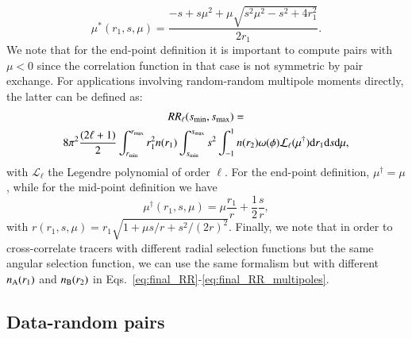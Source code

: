 \documentclass{aa}
\newcommand{\dd}{\mathrm{d}}
\begin{document}
%
\begin{equation}
    \mu^*(r_1, s, \mu) = \frac{-s+s\mu^2+\mu\sqrt{s^2\mu^2-s^2+4r_1^2}}{2r_1}.
\end{equation}
%
We note that for the end-point definition it is important to compute pairs with $\mu < 0$ since the correlation function in that case is not symmetric by pair exchange. For applications involving random-random multipole moments directly, the latter can be defined as: 
%
\begin{multline}
  RR_\ell(s_{\rm min}, s_{\rm max})  = \\
  8\pi^2\frac{(2\ell+1)}{2}\int_{r_{\rm min}}^{r_{\rm max}}r_1^2 n(r_1) \int_{s_{\rm min}}^{s_{\rm max}}s^2 \int_{-1}^{1} n(r_2)\omega(\phi)\mathcal{L}_\ell(\mu^\dagger)\dd r_1\dd s\dd\mu,
  \label{eq:final_RR_multipoles}
\end{multline}
%
with $\mathcal{L}_\ell$ the Legendre polynomial of order $\ell$. For the end-point definition, $\mu^\dagger = \mu$, while for the mid-point definition we have
\begin{equation}
    \mu^\dagger(r_1, s, \mu) = \mu \frac{r_1}{r} + \frac{1}{2}\frac{s}{r},
\end{equation}
with $r(r_1, s, \mu) = r_1\sqrt{1+\mu s/r + s^2/(2r)^2}$.
Finally, we note that in order to cross-correlate tracers with different radial selection functions but the same angular selection function, we can use the same formalism but with different $n_{\rm A}(r_1)$ and $n_{\rm B}(r_2)$ in Eqs.~\eqref{eq:final_RR}-\eqref{eq:final_RR_multipoles}.

\subsection{Data-random pairs}
\label{sec:DR_pairs}
\end{document}
